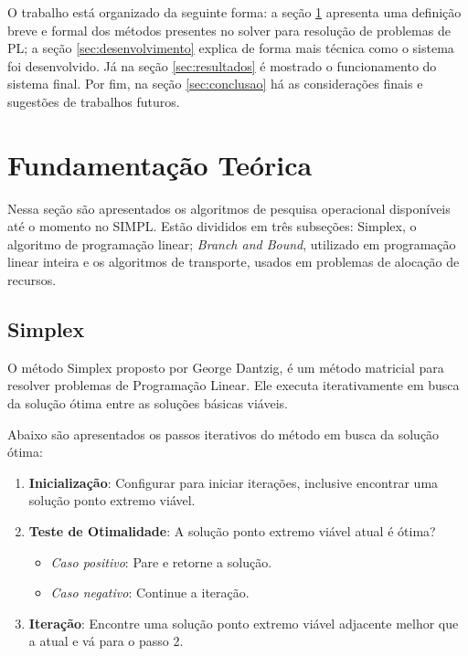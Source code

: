 \documentclass [11pt]{articleSBPO}
\newcommand{\sigla}[0] {SIMPL}
\begin{document}
O trabalho está organizado da seguinte forma: a seção \ref{sec:fundamentacao} apresenta uma definição breve e formal dos métodos presentes no solver para resolução de problemas de PL; a seção \ref{sec:desenvolvimento} explica de forma mais técnica como o sistema foi desenvolvido. Já na seção \ref{sec:resultados} é mostrado o funcionamento do sistema final. Por fim, na seção \ref{sec:conclusao} há as considerações finais e sugestões de trabalhos futuros.

\section{Fundamentação Teórica}\label{sec:fundamentacao}

Nessa seção são apresentados os algoritmos de pesquisa operacional disponíveis até o momento no \sigla. Estão divididos em três subseções: Simplex, o algoritmo de programação linear; \textit{Branch and Bound}, utilizado em programação linear inteira e os algoritmos de transporte, usados em problemas de alocação de recursos.

\subsection{Simplex}\label{subsec:Simplex}

O método Simplex proposto por George Dantzig, é um método matricial para resolver problemas de Programação Linear. Ele executa iterativamente em busca da solução ótima entre as soluções básicas viáveis. 

Abaixo são apresentados os passos iterativos do método em busca da solução ótima:

\begin{enumerate}
	\item \textbf{Inicialização}: Configurar para iniciar iterações, inclusive encontrar uma solução ponto extremo viável.
	\item \textbf{Teste de Otimalidade}: A solução ponto extremo viável atual é ótima?
	\begin{itemize}
		\item \textit{Caso positivo}: Pare e retorne a solução.
		\item \textit{Caso negativo}: Continue a iteração.
	\end{itemize}
	\item \textbf{Iteração}: Encontre uma solução ponto extremo viável adjacente melhor que a atual e vá para o passo 2.
\end{enumerate}
\end{document}
